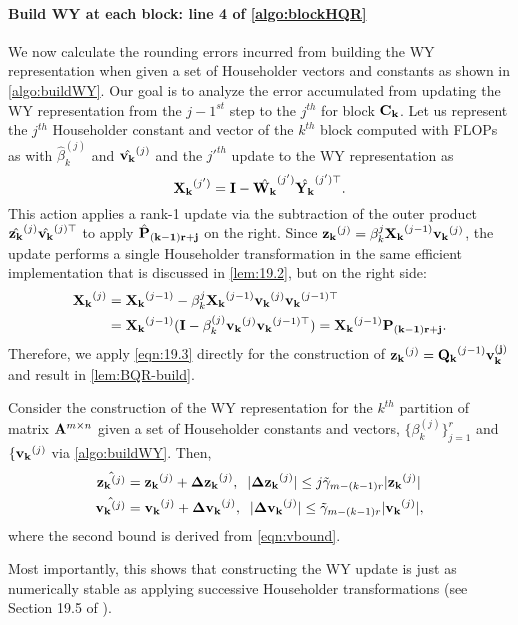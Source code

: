 \paragraph{Build WY at each block: line 4 of \cref{algo:blockHQR}}
We now calculate the rounding errors incurred from building the WY representation when given a set of Householder vectors and constants as shown in \cref{algo:buildWY}.
Our goal is to analyze the error accumulated from updating the WY representation from the $j-1^{st}$ step to the $j^{th}$ for block $\mathbf{C_k}$.
Let us represent the $j^{th}$ Householder constant and vector of the $k^{th}$ block computed with FLOPs as with $\hat{\beta}_k^{(j)}$ and $\hat{\mathbf{v_k}}^{(j)}$ and the $j'^{th}$ update to the WY representation as $$\mathbf{X_k}^{(j')} = \mathbf{I} - \hat{\mathbf{W_k}}^{(j')}\hat{\mathbf{Y_k}}^{(j')\top}.$$ %
This action applies a rank-1 update via the subtraction of the outer product $\hat{\mathbf{z_k}}^{(j)}\hat{\mathbf{v_k}}^{(j)\top}$ to apply $\hat{\mathbf{P}}_{\mathbf{(k-1)r+j}}$ on the right. 
Since $\mathbf{z_k}^{(j)} = \beta_k^{j}\mathbf{X_k}^{(j-1)}\mathbf{v_k}^{(j)}$, the update performs a single Householder transformation in the same efficient implementation that is discussed in \cref{lem:19.2}, but on the right side:
\begin{align*}
	\mathbf{X_k}^{(j)} &= \mathbf{X_k}^{(j-1)}-\beta_k^{j}\mathbf{X_k}^{(j-1)}\mathbf{v_k}^{(j)}\mathbf{v_k}^{(j-1)\top} \\
	&= \mathbf{X_k}^{(j-1)} (\mathbf{I}-\beta_k^{(j)}\mathbf{v_k}^{(j)}\mathbf{v_k}^{(j-1)\top})=  \mathbf{X_k}^{(j-1)}\mathbf{P_{(k-1)r+j}}.
\end{align*}
Therefore, we apply \cref{eqn:19.3} directly for the construction of $\mathbf{z_k}^{(j)} = \mathbf{Q_k}^{(j-1)}\mathbf{v_k^{(j)}}$ and result in \cref{lem:BQR-build}.
\begin{lemma}\label{lem:BQR-build}
	Consider the construction of the WY representation for the $k^{th}$ partition of matrix $\mathbf{A}^{m\times n}$ given a set of Householder constants and vectors, $\{\beta_k^{(j)}\}_{j=1}^r$ and $\{\mathbf{v_k}^{(j)}$ via \cref{algo:buildWY}.
	Then, 
	\begin{align*}
		\hat{\mathbf{z_k}^{(j)}}& = \mathbf{z_k}^{(j)} + \mathbf{\Delta z_k}^{(j)},\;\; |\mathbf{\Delta z_k}^{(j)}| \leq j\tilde{\gamma}_{m-(k-1)r} |\mathbf{z_k}^{(j)}|\\
		\hat{\mathbf{v_k}^{(j)}}& = \mathbf{v_k}^{(j)} + \mathbf{\Delta v_k}^{(j)},\;\; |\mathbf{\Delta v_k}^{(j)}| \leq \tilde{\gamma}_{m-(k-1)r} |\mathbf{v_k}^{(j)}|,
	\end{align*}
	where the second bound is derived from \cref{eqn:vbound}.
\end{lemma}
Most importantly, this shows that constructing the WY update is just as numerically stable as applying successive Householder transformations (see Section 19.5 of \cite{Higham2002}).
